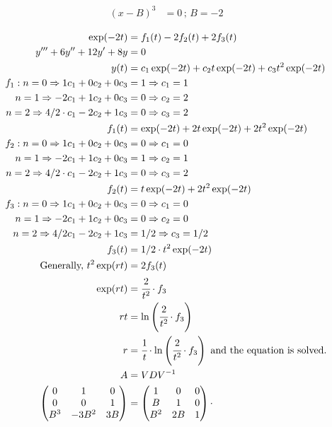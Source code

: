 \documentclass[12pt,a4paper]{article}
\begin{document}
\begin{align}
(x - B)^3 &= 0\,;\,B = -2
\end{align}

\begin{align}
\exp (-2t) &= f_1(t) - 2 f_2(t) + 2 f_3(t) \\
y''' + 6y'' + 12y' + 8y &= 0 \\
y(t) &= c_1 \exp(-2t) + c_2 t \exp(-2t) + c_3 t^2 \exp(-2t) \\
f_1: n = 0 \Rightarrow 1 c_1 + 0 c_2 + 0 c_3 &= 1 \Rightarrow c_1 = 1 \\
n = 1 \Rightarrow -2 c_1 + 1 c_2 + 0 c_3 &= 0 \Rightarrow c_2 = 2 \\
n = 2 \Rightarrow 4/2\cdot c_1 - 2 c_2 + 1 c_3 &= 0 \Rightarrow c_3 = 2 \\
f_1(t) &= \exp(-2t) + 2 t \exp(-2t) + 2 t^2 \exp(-2t) \\
f_2: n = 0 \Rightarrow 1 c_1 + 0 c_2 + 0 c_3 &= 0 \Rightarrow c_1 = 0 \\
n = 1 \Rightarrow -2 c_1 + 1 c_2 + 0 c_3 &= 1 \Rightarrow c_2 = 1 \\
n = 2 \Rightarrow 4/2\cdot c_1 - 2 c_2 + 1 c_3 &= 0 \Rightarrow c_3 = 2 \\
f_2(t) &= t \exp(-2t) + 2 t^2 \exp(-2t) \\
f_3: n = 0 \Rightarrow 1 c_1 + 0 c_2 + 0 c_3 &= 0 \Rightarrow c_1 = 0 \\
n = 1 \Rightarrow -2 c_1 + 1 c_2 + 0 c_3 &= 0 \Rightarrow c_2 = 0 \\
n = 2 \Rightarrow 4/2 c_1 - 2 c_2 + 1 c_3 &= 1/2 \Rightarrow c_3 = 1/2 \\
f_3(t) &= 1/2\cdot t^2 \exp(-2t) \\
\text{Generally, }t^2 \exp(rt) &= 2 f_3(t) \\
\exp (rt) &= \cfrac{2}{t^2}\cdot f_3 \\
rt &= \ln \left( \cfrac{2}{t^2}\cdot f_3\right) \\
r &= \cfrac{1}{t}\cdot \ln \left( \cfrac{2}{t^2}\cdot f_3\right) \text{ and the equation is solved.} \\
A &= VDV^{-1} \\
\left( \begin{matrix} 0 & 1 & 0 \\ 0 & 0 & 1 \\ B^3 & -3B^2 & 3B \end{matrix} \right)
&=
\left( \begin{matrix}  1 & 0 & 0 \\ B & 1 & 0 \\ B^2 & 2B & 1  \end{matrix} \right) \cdot

\end{align}
\end{document}
